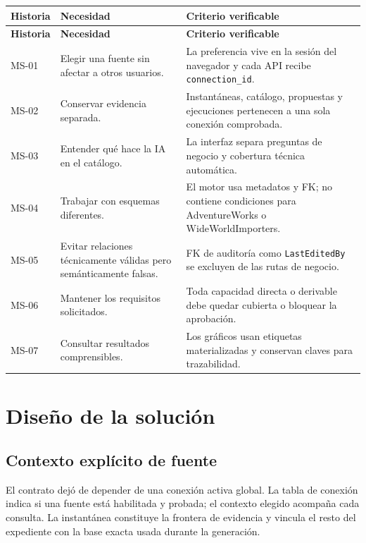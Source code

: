 \documentclass[11pt,letterpaper]{article}
\newcommand{\file}[1]{\texttt{#1}}
\begin{document}
\begin{longtable}{@{}p{}p{}p{}@{}}
  \toprule
  \textbf{Historia} & \textbf{Necesidad} & \textbf{Criterio verificable} \\
  \midrule
  \endfirsthead
  \toprule
  \textbf{Historia} & \textbf{Necesidad} & \textbf{Criterio verificable} \\
  \midrule
  \endhead
  MS-01 & Elegir una fuente sin afectar a otros usuarios. & La preferencia vive en la sesión del navegador y cada API recibe \file{connection\_id}. \\
  MS-02 & Conservar evidencia separada. & Instantáneas, catálogo, propuestas y ejecuciones pertenecen a una sola conexión comprobada. \\
  MS-03 & Entender qué hace la IA en el catálogo. & La interfaz separa preguntas de negocio y cobertura técnica automática. \\
  MS-04 & Trabajar con esquemas diferentes. & El motor usa metadatos y FK; no contiene condiciones para AdventureWorks o WideWorldImporters. \\
  MS-05 & Evitar relaciones técnicamente válidas pero semánticamente falsas. & FK de auditoría como \file{LastEditedBy} se excluyen de las rutas de negocio. \\
  MS-06 & Mantener los requisitos solicitados. & Toda capacidad directa o derivable debe quedar cubierta o bloquear la aprobación. \\
  MS-07 & Consultar resultados comprensibles. & Los gráficos usan etiquetas materializadas y conservan claves para trazabilidad. \\
  \bottomrule
\end{longtable}

\section{Diseño de la solución}

\subsection{Contexto explícito de fuente}

El contrato dejó de depender de una conexión activa global. La tabla de conexión indica si
una fuente está habilitada y probada; el contexto elegido acompaña cada consulta. La
instantánea constituye la frontera de evidencia y vincula el resto del expediente con la
base exacta usada durante la generación.
\end{document}
